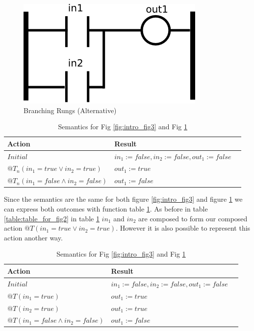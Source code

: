 \begin{figure}[htp]
    \centering
    \includegraphics[width=\imgsmall]{./images/intro_fig3a.png}
    \caption{Branching Rungs (Alternative)}
    \label{fig:intro_fig3a}
\end{figure}

\begin{table}[htp]
    \centering
       \begin{tabular}{|l|l|l|}
        \hline
        Action & Result \\
        \hline
        $Initial$ & $in_1 := false, in_2 := false, out_1 := false$\\
        \hline
        $@T_n(in_1 = true \vee in_2 = true)$ & $out_1 := true$ \\
        \hline
        $@T_n(in_1 = false \wedge in_2 = false)$ & $out_1 := false$\\
        \hline
    \end{tabular}
    \caption{Semantics for Fig \ref{fig:intro_fig3} and Fig \ref{fig:intro_fig3a}}
    \label{table:table_for_fig3}
\end{table}

Since the semantics are the same for both figure \ref{fig:intro_fig3} and figure \ref{fig:intro_fig3a} we can
express both outcomes with function table \ref{table:table_for_fig3}.
As before in table \ref{table:table_for_fig2} in table \ref{table:table_for_fig3} $in_1$ and $in_2$ are composed to form our composed action $@T(in_1 = true \vee in_2 = true)$. However it is also possible to represent this action another way.

\begin{table}[htp]
    \centering
       \begin{tabular}{|l|l|l|}
        \hline
        Action & Result \\
        \hline
        $Initial$ &$in_1 := false, in_2 := false, out_1 := false$\\
        \hline
        $@T(in_1 = true)$ & $out_1 := true$ \\
        \hline
        $@T(in_2 = true)$ & $out_1 := true$ \\
        \hline
        $@T(in_1 = false \wedge in_2 = false)$ & $out_1 := false$\\
        \hline
    \end{tabular}
    \caption{Semantics for Fig \ref{fig:intro_fig3} and Fig \ref{fig:intro_fig3a}}
    \label{table:table_for_fig3a}
\end{table}


